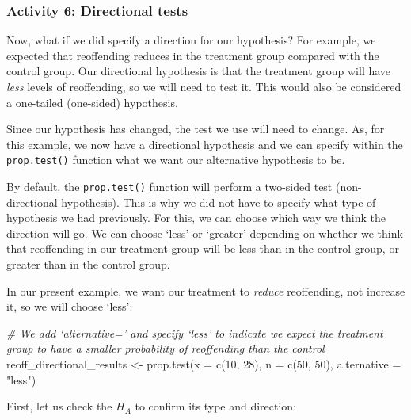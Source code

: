 \documentclass[
]{book}
\newenvironment{Shaded}{\begin{snugshade}}{\end{snugshade}}
\newcommand{\AttributeTok}[1]{\textcolor[rgb]{0.77,0.63,0.00}{#1}}
\newcommand{\CommentTok}[1]{\textcolor[rgb]{0.56,0.35,0.01}{\textit{#1}}}
\newcommand{\DecValTok}[1]{\textcolor[rgb]{0.00,0.00,0.81}{#1}}
\newcommand{\FunctionTok}[1]{\textcolor[rgb]{0.00,0.00,0.00}{#1}}
\newcommand{\NormalTok}[1]{#1}
\newcommand{\OtherTok}[1]{\textcolor[rgb]{0.56,0.35,0.01}{#1}}
\newcommand{\SpecialCharTok}[1]{\textcolor[rgb]{0.00,0.00,0.00}{#1}}
\newcommand{\StringTok}[1]{\textcolor[rgb]{0.31,0.60,0.02}{#1}}
\begin{document}
\hypertarget{activity-6-directional-tests}{%
\subsubsection{Activity 6: Directional tests}\label{activity-6-directional-tests}}

Now, what if we did specify a direction for our hypothesis? For example, we expected that reoffending reduces in the treatment group compared with the control group. Our directional hypothesis is that the treatment group will have \emph{less} levels of reoffending, so we will need to test it. This would also be considered a one-tailed (one-sided) hypothesis.

Since our hypothesis has changed, the test we use will need to change. As, for this example, we now have a directional hypothesis and we can specify within the \texttt{prop.test()} function what we want our alternative hypothesis to be.

By default, the \texttt{prop.test()} function will perform a two-sided test (non-directional hypothesis). This is why we did not have to specify what type of hypothesis we had previously. For this, we can choose which way we think the direction will go. We can choose `less' or `greater' depending on whether we think that reoffending in our treatment group will be less than in the control group, or greater than in the control group.

In our present example, we want our treatment to \emph{reduce} reoffending, not increase it, so we will choose `less':

\begin{Shaded}
\begin{Highlighting}[]
\CommentTok{\# We add ‘alternative=’ and specify ‘less’ to indicate we expect the treatment group to have a smaller probability of reoffending than the control}
\NormalTok{reoff\_directional\_results }\OtherTok{\textless{}{-}} \FunctionTok{prop.test}\NormalTok{(}\AttributeTok{x =} \FunctionTok{c}\NormalTok{(}\DecValTok{10}\NormalTok{, }\DecValTok{28}\NormalTok{), }\AttributeTok{n =} \FunctionTok{c}\NormalTok{(}\DecValTok{50}\NormalTok{, }\DecValTok{50}\NormalTok{), }\AttributeTok{alternative =} \StringTok{"less"}\NormalTok{)}
\end{Highlighting}
\end{Shaded}

First, let us check the \(H_A\) to confirm its type and direction:

\begin{Shaded}
\end{Shaded}
\end{document}
